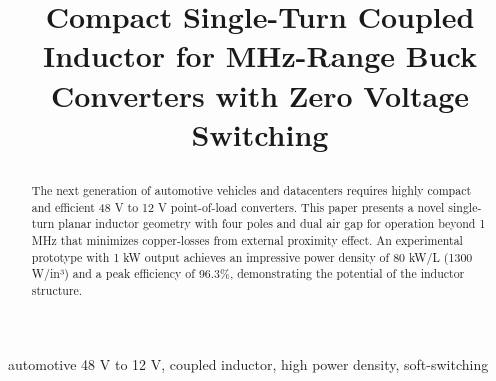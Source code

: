\documentclass{IPEC2026}
\begin{document}
\title{Compact Single-Turn Coupled Inductor for MHz-Range Buck Converters with Zero Voltage Switching

}




\maketitle

\begin{abstract}
The next generation of automotive vehicles and datacenters requires highly compact and efficient 48 V to 12 V point-of-load converters. This paper presents a novel single-turn planar inductor geometry with four poles and dual air gap for operation beyond 1 MHz that minimizes copper-losses from external proximity effect. An experimental prototype with 1 kW output achieves an impressive power density of 80 kW/L (1300 W/in³) and a peak efficiency of 96.3\%, demonstrating the potential of the inductor structure.
\end{abstract}

\begin{IEEEkeywords}
automotive 48 V to 12 V, coupled inductor, high power density, soft-switching
\end{IEEEkeywords}
\end{document}
